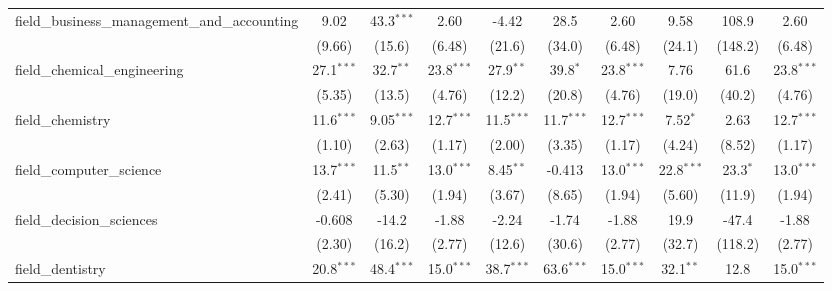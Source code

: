 \begin{tabular}{lccccccccc}
   field\_business\_management\_and\_accounting                & 9.02          & 43.3$^{***}$  & 2.60          & -4.42        & 28.5          & 2.60          & 9.58          & 108.9          & 2.60\\   
                                                               & (9.66)        & (15.6)        & (6.48)        & (21.6)       & (34.0)        & (6.48)        & (24.1)        & (148.2)        & (6.48)\\   
   field\_chemical\_engineering                                & 27.1$^{***}$  & 32.7$^{**}$   & 23.8$^{***}$  & 27.9$^{**}$  & 39.8$^{*}$    & 23.8$^{***}$  & 7.76          & 61.6           & 23.8$^{***}$\\   
                                                               & (5.35)        & (13.5)        & (4.76)        & (12.2)       & (20.8)        & (4.76)        & (19.0)        & (40.2)         & (4.76)\\   
   field\_chemistry                                            & 11.6$^{***}$  & 9.05$^{***}$  & 12.7$^{***}$  & 11.5$^{***}$ & 11.7$^{***}$  & 12.7$^{***}$  & 7.52$^{*}$    & 2.63           & 12.7$^{***}$\\   
                                                               & (1.10)        & (2.63)        & (1.17)        & (2.00)       & (3.35)        & (1.17)        & (4.24)        & (8.52)         & (1.17)\\   
   field\_computer\_science                                    & 13.7$^{***}$  & 11.5$^{**}$   & 13.0$^{***}$  & 8.45$^{**}$  & -0.413        & 13.0$^{***}$  & 22.8$^{***}$  & 23.3$^{*}$     & 13.0$^{***}$\\   
                                                               & (2.41)        & (5.30)        & (1.94)        & (3.67)       & (8.65)        & (1.94)        & (5.60)        & (11.9)         & (1.94)\\   
   field\_decision\_sciences                                   & -0.608        & -14.2         & -1.88         & -2.24        & -1.74         & -1.88         & 19.9          & -47.4          & -1.88\\   
                                                               & (2.30)        & (16.2)        & (2.77)        & (12.6)       & (30.6)        & (2.77)        & (32.7)        & (118.2)        & (2.77)\\   
   field\_dentistry                                            & 20.8$^{***}$  & 48.4$^{***}$  & 15.0$^{***}$  & 38.7$^{***}$ & 63.6$^{***}$  & 15.0$^{***}$  & 32.1$^{**}$   & 12.8           & 15.0$^{***}$\\   

\end{tabular}
